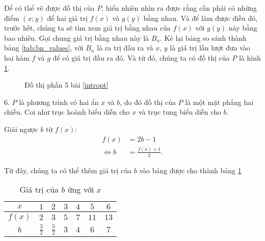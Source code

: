 \documentclass[a4paper, titlepage, openany]{book}
\begin{document}
Để có thể vẽ được đồ thị của $P$, hiển nhiên nhìn ra được rằng cần phải có những điểm $(x;y)$ để hai giá trị $f(x)$ và $g(y)$ bằng nhau. Và để làm được điều đó, trước hết, chúng ta sẽ tìm xem giá trị bằng nhau của $f(x)$ với $g(y)$ này bằng bao nhiêu. Gọi chung giá trị bằng nhau này là $B_n$. Kẻ lại bảng so sánh thành bảng \ref{tab:bn_values}, với $B_n$ là ra trị đầu ra và $x$, $y$ là giá trị lần lượt đưa vào hai hàm $f$ và $g$ để có giá trị đầu ra đó. Và từ đó, chúng ta có đồ thị của $P$ là hình \ref{fig:dtp5}.

\begin{figure}[h]
   \centering
   \caption{Đồ thị phần 5 bài \ref{intropt}}
   \label{fig:dtp5}
\end{figure}

6. $P$ là phương trình có hai ẩn $x$ và $b$, do đó đồ thị của $P$ là một mặt phẳng hai chiều. Coi như trục hoành biểu diễn cho $x$ và trục tung biểu diễn cho $b$.

Giải ngược $b$ từ $f(x)$:
\begin{align*}
   f(x) &= 2b - 1 \\
   \iff b &= \frac{f(x) + 1}{2}.
\end{align*}

Từ đây, chúng ta có thể thêm giá trị của $b$ vào bảng được cho thành bảng \ref{tab:b_values6}

\begin{table}[h]
   \centering
   \begin{tabular}{|c|c|c|c|c|c|c|}
      \hline
      $x$ & $1$ & $2$ & $3$ & $4$ & $5$ & $6$\\
      \hline
      $f(x)$ & $2$ & $3$ & $5$ & $7$ & $11$ & $13$\\
      \hline
      $b$ & $\frac{3}{2}$ & $\frac{5}{2}$ & $3$ & $4$ & $6$ & $7$\\
      \hline
   \end{tabular}
   \caption{Giá trị của $b$ ứng với $x$}
   \label{tab:b_values6}
\end{table}
\end{document}
